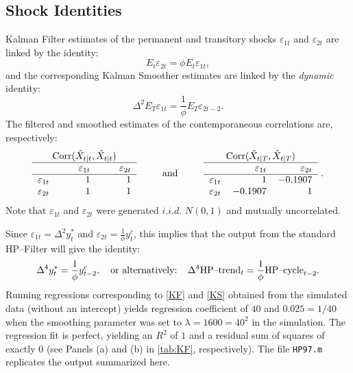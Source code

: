 \documentclass[a4paper,final,12pt]{article}
\begin{document}
\subsection{Shock Identities}

Kalman Filter estimates of the permanent and transitory shocks $\varepsilon
_{1t}$ and $\varepsilon _{2t}$ are linked by the identity:%
\begin{equation}
E_{t}\varepsilon _{2t}=\phi E_{t}\varepsilon _{1t},  \label{KF}
\end{equation}%
and the corresponding Kalman Smoother estimates are linked by the \emph{%
dynamic} identity: 
\begin{equation}
\Delta ^{2}E_{T}\varepsilon _{1t}=\frac{1}{\phi }E_{T}\varepsilon _{2t-2}.
\label{KS}
\end{equation}%
The filtered and smoothed estimates of the contemporaneous correlations are,
respectively: 
\begin{equation*}
\begin{tabular}{lrr}
\multicolumn{3}{c}{$\mathrm{Corr}(\hat{X}_{t|t},\hat{X}_{t|t})$} \\ \hline
& {$\varepsilon _{1t}$} & {$\varepsilon _{2t}$} \\ \hline
{$\varepsilon _{1t}$} & $\phantom{-.000}1$ & $\phantom{-.000}1$ \\ 
{$\varepsilon _{2t}$} & $1$ & $1$%
\end{tabular}%
\text{ \ \ \ \ \ \ \ and \ \ \ \ \ \ \ }%
\begin{tabular}{lrr}
\multicolumn{3}{c}{$\mathrm{Corr}(\hat{X}_{t|T},\hat{X}_{t|T})$} \\ \hline
& {$\varepsilon _{1t}$} & {$\varepsilon _{2t}$} \\ \hline
{$\varepsilon _{1t}$} & $1$ & $-0.1907$ \\ 
{$\varepsilon _{2t}$} & $-0.1907$ & $1$%
\end{tabular}%
~\text{.}
\end{equation*}%
Note that {$\varepsilon _{1t}$ and $\varepsilon _{2t}$ }were generated $%
i.i.d.$ $N(0,1)$ and mutually uncorrelated.

Since $\varepsilon _{1t}=\Delta ^{2}y_{t}^{\ast }$ and $\varepsilon _{2t}=%
\frac{1}{\phi }y_{t}^{c}$, this implies that the output from the standard
HP--Filter will give the identity:%
\begin{equation*}
\Delta ^{4}y_{t}^{\ast }=\frac{1}{\phi }y_{t-2}^{c},\text{ \ \ or\
alternatively: \ ~}\Delta ^{4}\text{HP--trend}_{t}=\frac{1}{\phi }\text{%
HP--cycle}_{t-2}.
\end{equation*}%
Running regressions corresponding to \ref{KF} and \ref{KS} obtained from the
simulated data (without an intercept) yields regression coefficient of $40$
and $0.025=1/40$ when the smoothing parameter was set to $\lambda
=1600=40^{2}$ in the simulation. The regression fit is perfect, yielding an $%
R^{2}$ of $1$ and a residual sum of squares of exactly $0$ (see Panels (a)
and (b) in \autoref{tab:KF}, respectively). The file \texttt{HP97.m}
replicates the output summarized here.
\end{document}
